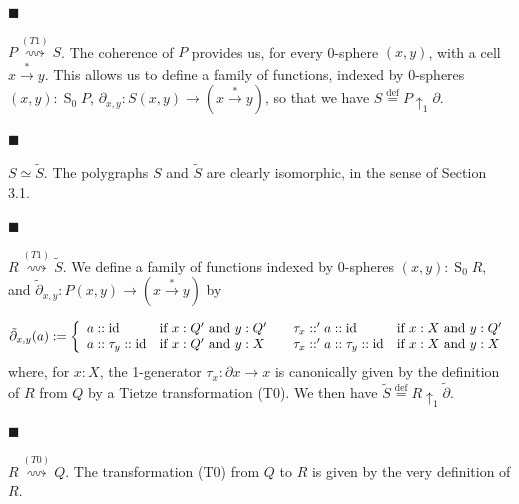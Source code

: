 \documentclass[10pt,a4paper]{amsart}
\begin{document}
\par\noindent  $\blacksquare$ 
 
$P\overset{(T1)}{\rightsquigarrow}S$. The coherence of $P$ provides us, for every 0-sphere $(x,y)$, with a cell $x\overset{*}{\to}y$. This allows us to define a family of functions, indexed by 0-spheres $(x,y):\operatorname{S}_{0}P$, $\partial_{x,y}:S(x,y)\to(x\overset{*}{\to}y)$, so that we have $S\overset{\text{def}}{=}P{\uparrow_{1}}\partial$.\par
 
 
 
\par\noindent  $\blacksquare$ 
 
$S\simeq\tilde{S}$. The polygraphs $S$ and $\tilde{S}$ are clearly isomorphic, in the sense of Section 3.1.\par
 
 
 
\par\noindent  $\blacksquare$ 
 
$R\overset{(T1)}{\rightsquigarrow}\tilde{S}$. We define a family of functions indexed by 0-spheres $(x,y):\operatorname{S}_{0}R$, and $\tilde{\partial}_{x,y}:P(x,y)\to(x\overset{*}{\to}y)$ by\par
    \[\tilde{\partial}_{x,y}(a):=\left\{\begin{array}[]{l@{\quad}l@{\qquad}l@{\quad}l}a::\operatorname{id}&\text{if $x:Q^{\prime}$ and $y:Q^{\prime}$}&\tau_{x}::^{\prime}a::\operatorname{id}&\text{if $x:X$ and $y:Q^{\prime}$}\\
a::\tau_{y}::\operatorname{id}&\text{if $x:Q^{\prime}$ and $y:X$}&\tau_{x}::^{\prime}a::\tau_{y}::\operatorname{id}&\text{if $x:X$ and $y:X$}\end{array}\right.\]    
where, for $x:X$, the 1-generator $\tau_{x}:\partial x\to x$ is canonically given by the definition of $R$ from $Q$ by a Tietze transformation (T0). We then have $\tilde{S}\overset{\text{def}}{=}R{\uparrow_{1}}\tilde{\partial}$.\par
 
 
 
\par\noindent  $\blacksquare$ 
 
$R\overset{(T0)}{\rightsquigarrow}Q$. The transformation (T0) from $Q$ to $R$ is given by the very definition of $R$.\par
 
\end{document}

